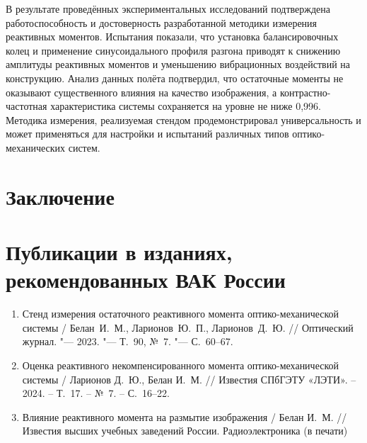 В результате проведённых экспериментальных исследований подтверждена работоспособность и достоверность разработанной методики измерения реактивных моментов.
Испытания показали, что установка балансировочных колец и применение синусоидального профиля разгона приводят к снижению амплитуды реактивных моментов и уменьшению вибрационных воздействий на конструкцию.
Анализ данных полёта подтвердил, что остаточные моменты не оказывают существенного влияния на качество изображения, а контрастно-частотная характеристика системы сохраняется на уровне не ниже 0,996.
Методика измерения, реализуемая стендом продемонстрировал универсальность и может применяться для настройки и испытаний различных типов оптико-механических систем.







\FloatBarrier
{}                                  %
\section*{Заключение}

\newpage
{}                                %

\section*{Публикации в изданиях, рекомендованных ВАК России}
\begin{enumerate}
\item  Стенд измерения остаточного реактивного момента оптико-механической системы / Белан~И.~М., Ларионов~Ю.~П., Ларионов~Д.~Ю.  // Оптический журнал. "--- 2023. "--- Т.~90, №~7. "--- С.~60--67.

\item Оценка реактивного некомпенсированного момента оптико-механической системы / Ларионов Д.~Ю., Белан И.~М. // Известия СПбГЭТУ «ЛЭТИ». – 2024. – Т.~17. – №~7. – С.~16--22.

\item Влияние реактивного момента на размытие изображения / Белан И.~М. //  Известия высших учебных заведений России. Радиоэлектроника (в печати)




\end{enumerate}

